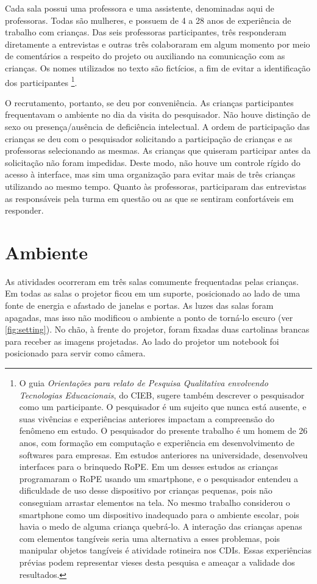 Cada sala possui uma professora e uma assistente, denominadas aqui de professoras. Todas são mulheres, e possuem de 4 a 28 anos de experiência de trabalho com crianças. Das seis professoras participantes, três responderam diretamente a entrevistas e outras três colaboraram em algum momento por meio de comentários a respeito do projeto ou auxiliando na comunicação com as crianças. Os nomes utilizados no texto são fictícios, a fim de evitar a identificação dos participantes
\footnote{
   O guia \textit{Orientações para relato de Pesquisa Qualitativa envolvendo Tecnologias Educacionais}, do \ac{CIEB}, sugere também descrever o pesquisador como um participante. O pesquisador é um sujeito que nunca está ausente, e suas vivências e experiências anteriores impactam a compreensão do fenômeno em estudo. O pesquisador do presente trabalho é um homem de 26 anos, com formação em computação e experiência em desenvolvimento de softwares para empresas. Em estudos anteriores na universidade, desenvolveu interfaces para o brinquedo RoPE. Em um desses estudos as crianças programaram o RoPE usando um smartphone, e o pesquisador entendeu a dificuldade de uso desse dispositivo por crianças pequenas, pois não conseguiam arrastar elementos na tela. No mesmo trabalho considerou o smartphone como um dispositivo inadequado para o ambiente escolar, pois havia o medo de alguma criança quebrá-lo. A interação das crianças apenas com elementos tangíveis seria uma alternativa a esses problemas, pois manipular objetos tangíveis é atividade rotineira nos CDIs. Essas experiências prévias podem representar vieses desta pesquisa e ameaçar a validade dos resultados.
}.
 
O recrutamento, portanto, se deu por conveniência. As crianças participantes frequentavam o ambiente no dia da visita do pesquisador. Não houve distinção de sexo ou presença/ausência de deficiência intelectual. A ordem de participação das crianças se deu com o pesquisador solicitando a participação de crianças e as professoras selecionando as mesmas. As crianças que quiseram participar antes da solicitação não foram impedidas. Deste modo, não houve um controle rígido do acesso à interface, mas sim uma organização para evitar mais de três crianças utilizando ao mesmo tempo. Quanto às professoras, participaram das entrevistas as responsáveis pela turma em questão ou as que se sentiram confortáveis em responder.

\section{Ambiente}
\label{sec:ambiente}
As atividades ocorreram em três salas comumente frequentadas pelas crianças. Em todas as salas o projetor ficou em um suporte, posicionado ao lado de uma fonte de energia e afastado de janelas e portas. As luzes das salas foram apagadas, mas isso não modificou o ambiente a ponto de torná-lo escuro (ver \autoref{fig:setting}). No chão, à frente do projetor, foram fixadas duas cartolinas brancas para receber as imagens projetadas. Ao lado do projetor um notebook foi posicionado para servir como câmera. 

